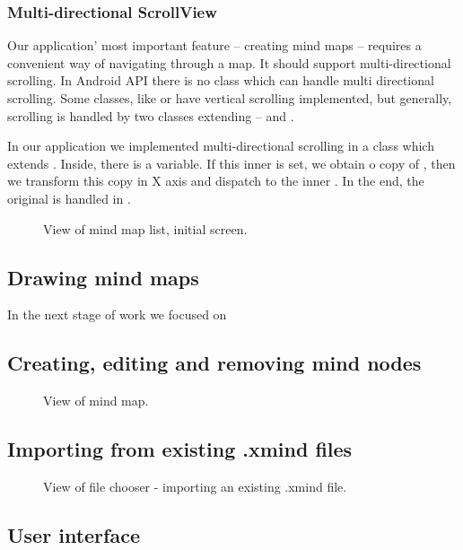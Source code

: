 \subsubsection{Multi-directional ScrollView}
\label{subsubsec:action-bar}
Our application' most important feature -- creating mind maps -- requires a convenient way of navigating through a map. It should support multi-directional scrolling. In Android API there is no class which can handle multi directional scrolling. Some classes, like  or  have vertical scrolling implemented, but generally, scrolling is handled by two classes extending  --  and . 

In our application we implemented multi-directional scrolling in a class  which extends . Inside, there is a  variable. If this inner  is set, we obtain o copy of , then we transform this copy in X axis and dispatch to the inner . In the end, the original  is handled in .

\begin{figure}[h]
	\centering
	\caption{View of mind map list, initial screen.}
	\label{fig:screen-maplist}
\end{figure}

\subsection{Drawing mind maps}
\label{subsec:drawing}
In the next stage of work we focused on

\subsection{Creating, editing and removing mind nodes}
\label{subsec:drawing}

\begin{figure}[h]
	\centering
	\caption{View of mind map.}
	\label{fig:screen-map}
\end{figure}

\subsection{Importing from existing .xmind files}
\label{subsec:import}

\begin{figure}[h]
	\centering
	\caption{View of file chooser - importing an existing .xmind file.}
	\label{fig:screen-filechooser}
\end{figure}


\subsection{User interface}
\label{subsec:ui}
